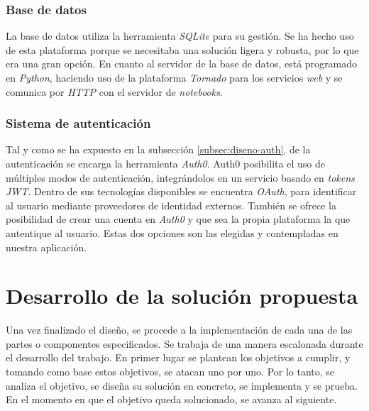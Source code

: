 \documentclass[11pt,spanish,listoffigures]{tfgetsinf}
\begin{document}
\subsection{Base de datos}
\label{subsec:tecno-DB}

La base de datos utiliza la herramienta \textit{SQLite} para su gestión. Se ha hecho uso de esta plataforma porque se necesitaba una solución ligera y robusta, por lo que era una gran opción. En cuanto al servidor de la base de datos, está programado en \textit{Python}, haciendo uso de la plataforma \textit{Tornado} para los servicios \textit{web} y se comunica por \textit{HTTP} con el servidor de \textit{notebooks}.


\subsection{Sistema de autenticación}
\label{subsec:tecno-auth}

Tal y como se ha expuesto en la subsección \ref{subsec:diseno-auth}, de la autenticación se encarga la herramienta \textit{Auth0}. Auth0 posibilita el uso de múltiples modos de autenticación, integrándolos en un servicio basado en \textit{tokens} \textit{JWT}. Dentro de sus tecnologías disponibles se encuentra \textit{OAuth}, para identificar al usuario mediante proveedores de identidad externos. También se ofrece la posibilidad de crear una cuenta en \textit{Auth0} y que sea la propia plataforma la que autentique al usuario. Estas dos opciones son las elegidas y contempladas en nuestra aplicación.





\chapter{Desarrollo de la solución propuesta}
\label{ch:desarrollo-solucion}

Una vez finalizado el diseño, se procede a la implementación de cada una de las partes o componentes especificados. Se trabaja de una manera escalonada durante el desarrollo del trabajo. En primer lugar se plantean los objetivos a cumplir, y tomando como base estos objetivos, se atacan uno por uno. Por lo tanto, se analiza el objetivo, se diseña su solución en concreto, se implementa y se prueba. En el momento en que el objetivo queda solucionado, se avanza al siguiente.
\end{document}
